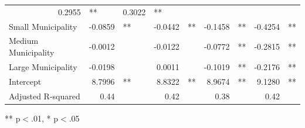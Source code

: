 \documentclass[12pt]{article}
\begin{document}
\begin{table}[!h]
\begin{tabular}{lllllllll}
  \multicolumn{1}{r}{0.2955} &
  \multicolumn{1}{l}{**} &
  \multicolumn{1}{r}{0.3022} &
  \multicolumn{1}{l}{**} \\
\multicolumn{1}{l}{Small Municipality} &
  \multicolumn{1}{r}{-0.0859} &
  \multicolumn{1}{l}{**} &
  \multicolumn{1}{r}{-0.0442} &
  \multicolumn{1}{l}{**} &
  \multicolumn{1}{r}{-0.1458} &
  \multicolumn{1}{l}{**} &
  \multicolumn{1}{r}{-0.4254} &
  \multicolumn{1}{l}{**} \\
\multicolumn{1}{l}{Medium Municipality} &
  \multicolumn{1}{r}{-0.0012} &
  \multicolumn{1}{l}{} &
  \multicolumn{1}{r}{-0.0122} &
  \multicolumn{1}{l}{} &
  \multicolumn{1}{r}{-0.0772} &
  \multicolumn{1}{l}{**} &
  \multicolumn{1}{r}{-0.2815} &
  \multicolumn{1}{l}{**} \\
\multicolumn{1}{l}{Large Municipality} &
  \multicolumn{1}{r}{-0.0198} &
  \multicolumn{1}{l}{} &
  \multicolumn{1}{r}{0.0011} &
  \multicolumn{1}{l}{} &
  \multicolumn{1}{r}{-0.1019} &
  \multicolumn{1}{l}{**} &
  \multicolumn{1}{r}{-0.2176} &
  \multicolumn{1}{l}{**} \\
\multicolumn{1}{l}{Intercept} &
  \multicolumn{1}{r}{8.7996} &
  \multicolumn{1}{l}{**} &
  \multicolumn{1}{r}{8.8322} &
  \multicolumn{1}{l}{**} &
  \multicolumn{1}{r}{8.9674} &
  \multicolumn{1}{l}{**} &
  \multicolumn{1}{r}{9.1280} &
  \multicolumn{1}{l}{**} \\
\multicolumn{1}{l}{Adjusted R-squared} &
  \multicolumn{1}{r}{0.44} &
  \multicolumn{1}{l}{} &
  \multicolumn{1}{r}{0.42} &
  \multicolumn{1}{l}{} &
  \multicolumn{1}{r}{0.38} &
  \multicolumn{1}{l}{} &
  \multicolumn{1}{r}{0.42} &
  \multicolumn{1}{l}{} \\
\cline{1-9}
\end{tabular}

\footnotesize{
** p$<$.01, * p$<$.05
}
\end{table}

\clearpage
\end{document}
